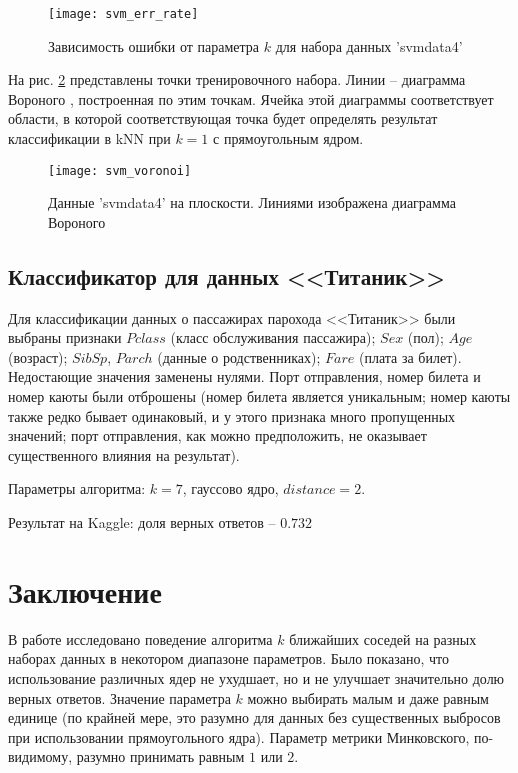 \documentclass[a4paper,12pt]{article} %
\newcommand{\myPictWidth}{.95\textwidth}
\begin{document}
\begin{figure}[H]
    \centering \texttt{[image: svm\_err\_rate]}
    \caption{Зависимость ошибки от параметра $k$ для набора данных 'svmdata4'}
    \label{fig:svm_err_rate}
\end{figure}

На рис. \ref{fig:svm_voronoi} представлены точки тренировочного набора. Линии -- диаграмма Вороного \cite{murphy}, построенная по этим точкам. Ячейка этой диаграммы соответствует области, в которой соответствующая точка будет определять результат классификации в kNN при $k=1$ с прямоугольным ядром.

\begin{figure}[H]
    \centering \texttt{[image: svm\_voronoi]}
    \caption{Данные 'svmdata4' на плоскости. Линиями изображена диаграмма Вороного}
    \label{fig:svm_voronoi}
\end{figure}

\subsection{Классификатор для данных <<Титаник>>}

Для классификации данных о пассажирах парохода <<Титаник>> были выбраны признаки $Pclass$ (класс обслуживания пассажира); $Sex$ (пол); $Age$ (возраст); $SibSp$, $Parch$ (данные о родственниках); $Fare$ (плата за билет). Недостающие значения заменены нулями.
Порт отправления, номер билета и номер каюты были отброшены (номер билета является уникальным; номер каюты также редко бывает одинаковый, и у этого признака много пропущенных значений; порт отправления, как можно предположить, не оказывает существенного влияния на результат).

Параметры алгоритма: $ k = 7 $, гауссово ядро, $distance = 2$.

Результат на Kaggle: доля верных ответов -- $0.732$

\newpage
\section{Заключение}

В работе исследовано поведение алгоритма $k$ ближайших соседей на разных наборах данных в некотором диапазоне параметров.
Было показано, что использование различных ядер не ухудшает, но и не улучшает значительно долю верных ответов. Значение параметра $k$ можно выбирать малым и даже равным единице (по крайней мере, это разумно для данных без существенных выбросов при использовании прямоугольного ядра).
Параметр метрики Минковского, по-видимому, разумно принимать равным $1$ или $2$.
\end{document}
